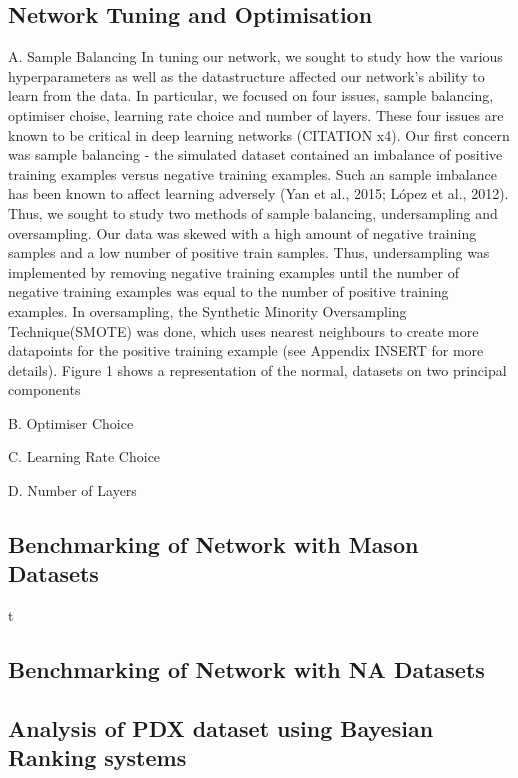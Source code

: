 \documentclass{article}
\begin{document}
\subsection{Network Tuning and Optimisation}
A. Sample Balancing
In tuning our network, we sought to study how the various hyperparameters as well as the datastructure affected our network's ability to learn from the data. In particular, we focused on four issues, sample balancing, optimiser choise, learning rate choice and number of layers. These four issues are known to be critical in deep learning networks (CITATION x4). Our first concern was sample balancing - the simulated dataset contained an imbalance of positive training examples versus negative training examples. Such an sample imbalance has been known to affect learning adversely (Yan et al., 2015; López et al., 2012). Thus, we sought to study two methods of sample balancing, undersampling and oversampling. Our data was skewed with a high amount of negative training samples and  a low number of positive train samples. Thus, undersampling was implemented by removing negative training examples until the number of negative training examples was equal to the number of positive training examples. In oversampling, the Synthetic Minority Oversampling Technique(SMOTE) was done, which uses nearest neighbours to create more datapoints for the positive training example (see Appendix INSERT for more details). Figure 1 shows a representation of the normal, datasets on two principal components




B. Optimiser Choice



C. Learning Rate Choice



D. Number of Layers 



\subsection{Benchmarking of Network with Mason Datasets}
t

\subsection{Benchmarking of Network with NA Datasets}


\subsection{Analysis of PDX dataset using Bayesian Ranking systems}
\end{document}
